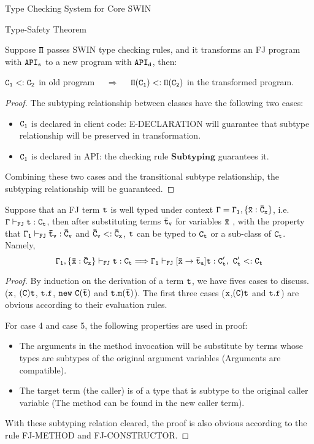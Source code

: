 \begin{section}{Type Checking System for Core SWIN}
\begin{subsection}{Type-Safety Theorem}
\begin{lemma}[Subtyping]
Suppose $\tt \Pi$ passes SWIN type checking rules, and it transforms an FJ program with $\tt API_s$ to a new program with $\tt API_d$, then:\par
$\tt C_1<: C_2 $ in old program ~~$\Longrightarrow$~~ $\tt\Pi(C_1)<:\Pi(C_2)$ in the transformed program.
\end{lemma}
\begin{proof}
The subtyping relationship between classes have the following two cases:
\begin{itemize}
\item $\tt C_1$ is declared in client code: E-DECLARATION will guarantee that subtype relationship will be preserved in transformation.
\item $\tt C_1$ is declared in API: the checking rule $\mathbf{Subtyping}$ guarantees it. 
\end{itemize}
Combining these two cases and the transitional subtype relationship, the subtyping relationship will be guaranteed.
\end{proof}

\begin{lemma}
Suppose that an FJ term $\tt t$ is well typed under context $\tt \Gamma=\Gamma_1,\{\bar{x}:\bar{C}_x\}$, i.e. $\tt \Gamma\vdash_{FJ} t:C_t$, then after substituting terms $\tt \bar{t}_v$ for variables $\tt \bar{x}$ , with the property that $\tt\Gamma_1\vdash_{FJ}\bar{t}_v:\bar{C}_v$ and $\tt\bar{C}_v <: \bar{C}_x$, $\tt t$ can be typed to $\tt C_t$ or a sub-class of $\tt C_t$. Namely,
$$\tt \Gamma_1,\{\bar{x}:\bar{C}_x\} \vdash_{FJ} t:C_t \Longrightarrow \Gamma_1\vdash_{FJ} [\bar{x}\rightarrow\bar{t}_u]t: C'_t,\ C'_t <: C_t$$
\end{lemma}
\begin{proof}
By induction on the derivation of a term $\tt t$, we have fives cases to discuss. ($\tt x$, $\tt(C)t$, $\tt t.f$, $\tt new~C(\bar{t})$ and $\tt t.m(\bar{t})$).
The first three cases ($\tt x$,$\tt (C)t$ and $\tt t.f$) are obvious according to their evaluation rules.

For case 4 and case 5, the following properties are used in proof:
\begin{itemize}
\item The arguments in the method invocation will be substitute by terms whose types are subtypes of the original argument variables (Arguments are compatible).
\item The target term (the caller) is of a type that is subtype to the original caller variable (The method can be found in the new caller term).
\end{itemize}
With these subtyping relation cleared, the proof is also obvious according to the rule FJ-METHOD and FJ-CONSTRUCTOR.
\end{proof}


\end{subsection}
\end{section}
